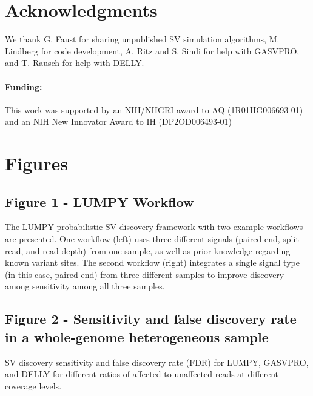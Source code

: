 \documentclass[10pt]{bmc_article}
\def\texttt{[image: ]}
\newenvironment{bmcformat}{\begin{raggedright}\baselineskip20pt\sloppy\setboolean{publ}{false}}{\end{raggedright}\baselineskip20pt\sloppy}
\begin{document}
\begin{bmcformat}
\section*{Acknowledgments}
We thank G. Faust for sharing unpublished SV simulation algorithms, M. Lindberg
for code development, A. Ritz and S. Sindi for help with GASVPRO, and T. Rausch
for help with DELLY.

\paragraph{Funding:} This work was supported by an NIH/NHGRI award to
AQ (1R01HG006693-01) and an NIH New Innovator Award to IH (DP2OD006493-01)

%
%

{
   }



\section*{Figures}
\subsection*{Figure 1 - LUMPY Workflow}
The LUMPY probabilistic SV discovery framework with two example
workflows are presented. One workflow (left) uses three different signals
(paired-end, split-read, and read-depth) from one sample, as well as prior
knowledge regarding known variant sites. The second workflow (right) integrates
a single signal type (in this case, paired-end) from three different samples to
improve discovery among sensitivity among all three samples.

\subsection*{Figure 2 - Sensitivity and false discovery rate in a whole-genome
heterogeneous sample}
SV discovery sensitivity and false discovery rate (FDR) for LUMPY, GASVPRO, and
DELLY for different ratios of affected to unaffected reads at different coverage
levels.


\end{bmcformat}
\end{document}
